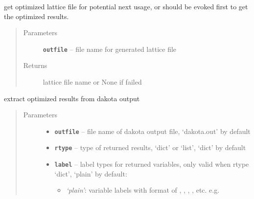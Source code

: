 \documentclass[letterpaper,10pt,english]{sphinxmanual}
\begin{document}
\begin{fulllineitems}
\begin{fulllineitems}
\end{fulllineitems}


\begin{fulllineitems}
\label{src/apidocs/dakopt:genopt.dakopt.DakotaOC.get_opt_latfile}
get optimized lattice file for potential next usage,
 or  should be evoked first to get the 
optimized results.
\begin{quote}\begin{description}
\item[{Parameters}] \leavevmode
\textbf{\texttt{outfile}} -- file name for generated lattice file

\item[{Returns}] \leavevmode
lattice file name or None if failed

\end{description}\end{quote}

\end{fulllineitems}


\begin{fulllineitems}
\label{src/apidocs/dakopt:genopt.dakopt.DakotaOC.get_opt_results}
extract optimized results from dakota output
\begin{quote}\begin{description}
\item[{Parameters}] \leavevmode\begin{itemize}
\item {} 
\textbf{\texttt{outfile}} -- file name of dakota output file, 
`dakota.out' by default

\item {} 
\textbf{\texttt{rtype}} -- type of returned results, `dict' or `list', 
`dict' by default

\item {} 
\textbf{\texttt{label}} -- 
label types for returned variables, only valid when rtype `dict', 
`plain' by default:
\begin{itemize}
\item {} 
\emph{`plain'}: variable labels with format of , , , , etc.
e.g. 


\end{itemize}
\end{itemize}
\end{description}
\end{quote}
\end{fulllineitems}
\end{fulllineitems}
\end{document}
